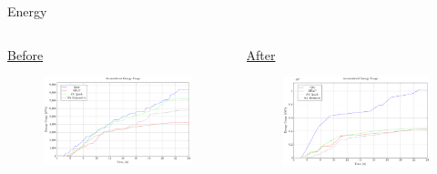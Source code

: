 \documentclass[aspectratio=169,dvipsnames]{beamer}
\begin{document}
\begin{frame}[label={sec:org4a68cf9}]{Energy}
\begin{columns}
\begin{column}{0.5\columnwidth}
\begin{center} {\small \underline{Before}}\end{center}

\begin{figure}[htpb]
\centering
    \includegraphics[width=\textwidth]{img/sa-pap-paper-bad/energy}
\end{figure}
\end{column}

\begin{column}{0.5\columnwidth}
\begin{center} {\small \underline{After}}\end{center}

\begin{figure}[htpb]
\centering
    \includegraphics[width=\textwidth]{img/sa-pap-paper-good/energy}
\end{figure}
\end{column}
\end{columns}
\end{frame}
\end{document}
